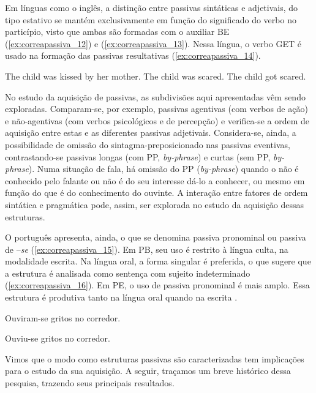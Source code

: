 \documentclass[output=paper]{LSP/langsci}
\begin{document}
Em línguas como o inglês, a distinção entre passivas sintáticas e adjetivais, do tipo estativo se mantém exclusivamente em função do significado do verbo no particípio, visto que ambas são formadas com o auxiliar BE (\ref{ex:correapassiva_12}) e (\ref{ex:correapassiva_13}). Nessa língua, o verbo GET é usado na formação das passivas resultativas (\ref{ex:correapassiva_14}).

\ea\label{ex:correapassiva_12} The child was kissed by her mother.
\z
\ea\label{ex:correapassiva_13} The child was scared.
\z
\ea\label{ex:correapassiva_14} The child got scared.
\z

No estudo da aquisição de passivas, as subdivisões aqui apresentadas vêm sendo exploradas. Comparam-se, por exemplo, passivas agentivas (com verbos de ação) e não-agentivas (com verbos psicológicos e de percepção) e verifica-se a ordem de aquisição entre estas e as diferentes passivas adjetivais. Considera-se, ainda, a possibilidade de omissão do sintagma-preposicionado nas passivas eventivas, contrastando-se passivas longas (com PP, \textit{by-phrase}) e curtas (sem PP, \textit{by-phrase}). Numa situação de fala, há omissão do PP (\textit{by-phrase}) quando o  não é conhecido pelo falante ou não é do seu interesse dá-lo a conhecer, ou mesmo em função do que é do conhecimento do ouvinte. A interação entre fatores de ordem sintática e pragmática pode, assim, ser explorada no estudo da aquisição dessas estruturas.

O português apresenta, ainda, o que se denomina passiva pronominal ou passiva de –\textit{se} (\ref{ex:correapassiva_15}). Em PB, seu uso é restrito à língua culta, na modalidade escrita. Na língua oral, a forma singular é preferida, o que sugere que a estrutura é analisada como sentença com sujeito indeterminado (\ref{ex:correapassiva_16}). Em PE, o uso de passiva pronominal é mais amplo. Essa estrutura é produtiva tanto na língua oral quando na escrita \cite{correia2003}.

\ea\label{ex:correapassiva_15} Ouviram-se gritos no corredor.
\z

\ea\label{ex:correapassiva_16} Ouviu-se gritos no corredor.
\z

Vimos que o modo como estruturas passivas são caracterizadas tem implicações para o estudo da sua aquisição. A seguir, traçamos um breve histórico dessa pesquisa, trazendo seus principais resultados.
\end{document}
